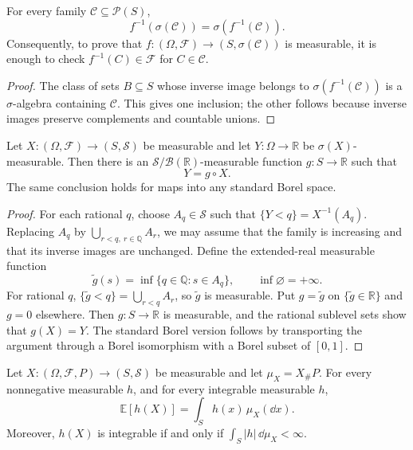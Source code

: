\begin{prop}
For every family $\mathcal C\subseteq\mathcal P(S)$,
\[
f^{-1}(\sigma(\mathcal C))=\sigma(f^{-1}(\mathcal C)).
\]
Consequently, to prove that $f:(\Omega,\mathcal F)\to(S,\sigma(\mathcal C))$
is measurable, it is enough to check $f^{-1}(C)\in\mathcal F$ for
$C\in\mathcal C$.
\end{prop}

\begin{proof}
The class of sets $B\subseteq S$ whose inverse image belongs to
$\sigma(f^{-1}(\mathcal C))$ is a $\sigma$-algebra containing $\mathcal C$.
This gives one inclusion; the other follows because inverse images preserve
complements and countable unions.
\end{proof}

\begin{thm}
Let $X:(\Omega,\mathcal F)\to(S,\mathcal S)$ be measurable and let
$Y:\Omega\to\mathbb R$ be $\sigma(X)$-measurable. Then there is an
$\mathcal S/\mathcal B(\mathbb R)$-measurable function $g:S\to\mathbb R$ such
that
\[
Y=g\circ X.
\]
The same conclusion holds for maps into any standard Borel space.
\end{thm}

\begin{proof}
For each rational $q$, choose $A_q\in\mathcal S$ such that
$\{Y<q\}=X^{-1}(A_q)$. Replacing $A_q$ by
$\bigcup_{r<q,\ r\in\mathbb Q}A_r$, we may assume that the family is
increasing and that its inverse images are unchanged. Define the extended-real measurable function
\[
\widetilde g(s)=\inf\{q\in\mathbb Q:s\in A_q\},
\qquad \inf\varnothing=+\infty.
\]
For rational $q$,
$\{\widetilde g<q\}=\bigcup_{r<q}A_r$, so $\widetilde g$ is measurable. Put
$g=\widetilde g$ on $\{\widetilde g\in\mathbb R\}$ and $g=0$ elsewhere.
Then $g:S\to\mathbb R$ is measurable, and the rational sublevel sets show
that $g(X)=Y$. The standard Borel version follows by
transporting the argument through a Borel isomorphism with a Borel subset of
$[0,1]$.
\end{proof}

\begin{thm}
Let $X:(\Omega,\mathcal F,P)\to(S,\mathcal S)$ be measurable and let
$\mu_X=X_\#P$. For every nonnegative measurable $h$, and for every integrable
measurable $h$,
\[
\mathbb E[h(X)]=\int_S h(x)\,\mu_X(\dd x).
\]
Moreover, $h(X)$ is integrable if and only if
$\int_S|h|\,\dd\mu_X<\infty$.
\end{thm}

